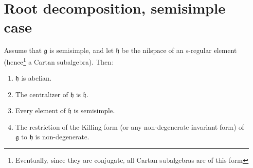 \section{Root decomposition, semisimple case}

\begin{theorem}
 Assume that $\mathfrak g$ is semisimple, and let $\mathfrak h$ be the nilspace of an s-regular element (hence\footnote{Eventually, since they are conjugate, all Cartan subalgebras are of this form} a Cartan subalgebra). Then:
\begin{enumerate}
 \item $\mathfrak h$ is abelian.
 \item The centralizer of $\mathfrak h$ is $\mathfrak h$.
 \item Every element of $\mathfrak h$ is semisimple.
 \item The restriction of the Killing form (or any non-degenerate invariant form) of $\mathfrak g$ to $\mathfrak h$ is non-degenerate.
\end{enumerate}
\end{theorem}

